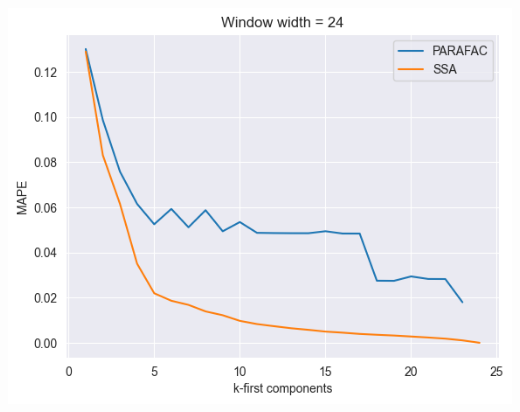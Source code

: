 \documentclass{article}
\begin{document}
\includegraphics[scale=0.7]{./images/fig3.png}





\end{document}
